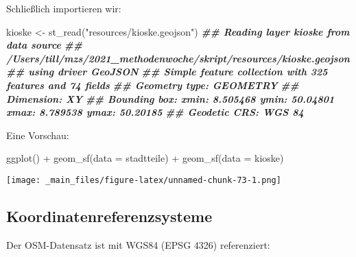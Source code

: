 \documentclass[11pt,german,a4paper]{article}
\newenvironment{Shaded}{\begin{snugshade}}{\end{snugshade}}
\newcommand{\AttributeTok}[1]{\textcolor[rgb]{0.77,0.63,0.00}{#1}}
\newcommand{\DocumentationTok}[1]{\textcolor[rgb]{0.56,0.35,0.01}{\textbf{\textit{#1}}}}
\newcommand{\FunctionTok}[1]{\textcolor[rgb]{0.00,0.00,0.00}{#1}}
\newcommand{\NormalTok}[1]{#1}
\newcommand{\OtherTok}[1]{\textcolor[rgb]{0.56,0.35,0.01}{#1}}
\newcommand{\SpecialCharTok}[1]{\textcolor[rgb]{0.00,0.00,0.00}{#1}}
\newcommand{\StringTok}[1]{\textcolor[rgb]{0.31,0.60,0.02}{#1}}
\begin{document}
Schließlich importieren wir:

\begin{Shaded}
\begin{Highlighting}[]
\NormalTok{kioske }\OtherTok{\textless{}{-}} \FunctionTok{st\_read}\NormalTok{(}\StringTok{"resources/kioske.geojson"}\NormalTok{)}
\DocumentationTok{\#\# Reading layer \textasciigrave{}kioske\textquotesingle{} from data source }
\DocumentationTok{\#\#   \textasciigrave{}/Users/till/mzs/2021\_methodenwoche/skript/resources/kioske.geojson\textquotesingle{} }
\DocumentationTok{\#\#   using driver \textasciigrave{}GeoJSON\textquotesingle{}}
\DocumentationTok{\#\# Simple feature collection with 325 features and 74 fields}
\DocumentationTok{\#\# Geometry type: GEOMETRY}
\DocumentationTok{\#\# Dimension:     XY}
\DocumentationTok{\#\# Bounding box:  xmin: 8.505468 ymin: 50.04801 xmax: 8.789538 ymax: 50.20185}
\DocumentationTok{\#\# Geodetic CRS:  WGS 84}
\end{Highlighting}
\end{Shaded}

Eine Vorschau:

\begin{Shaded}
\begin{Highlighting}[]
\FunctionTok{ggplot}\NormalTok{() }\SpecialCharTok{+}
  \FunctionTok{geom\_sf}\NormalTok{(}\AttributeTok{data =}\NormalTok{ stadtteile) }\SpecialCharTok{+}
  \FunctionTok{geom\_sf}\NormalTok{(}\AttributeTok{data =}\NormalTok{ kioske)}
\end{Highlighting}
\end{Shaded}

\texttt{[image: \_main\_files/figure-latex/unnamed-chunk-73-1.png]}

\hypertarget{koordinatenreferenzsysteme}{%
\subsection{Koordinatenreferenzsysteme}\label{koordinatenreferenzsysteme}}

Der OSM-Datensatz ist mit WGS84 (EPSG 4326) referenziert:
\end{document}
